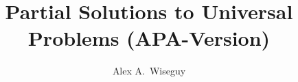 \documentclass[master,english,smartquotes,apa]{hgbthesis}
\title{Partial Solutions to Universal Problems (APA-Version)}
\author{Alex A.\ Wiseguy}
\begin{document}

\frontmatter							%

\maketitle
\tableofcontents




\mainmatter          			%










\appendix                                         %


\MakeBibliography                        				%



\end{document}
